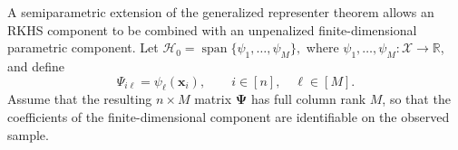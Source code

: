{	%


	A semiparametric extension of the generalized representer theorem
	\cite{scholkopf2001generalized} allows an RKHS component to be combined with
	an unpenalized finite-dimensional parametric component. Let
	$
	    \mathcal H_0
	    =
	    \operatorname{span}\{\psi_1,\ldots,\psi_M\},
	$
	where $\psi_1,\ldots,\psi_M:\mathcal X\to\mathbb R$, and define
	\begin{equation*}
	    \Psi_{i\ell}
	    =
	    \psi_\ell(\bm{x}_i),
	    \qquad
	    i\in \left[n\right],
	    \quad
	    \ell\in\left[M\right].
	\end{equation*}
	Assume that the resulting $n\times M$ matrix $\bm\Psi$ has full column rank
	$M$, so that the coefficients of the finite-dimensional component are
	identifiable on the observed sample.

}

